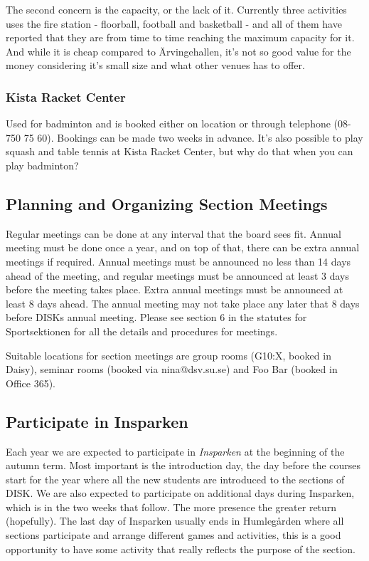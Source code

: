 \documentclass[12pt,a4paper]{article}
\begin{document}
			The second concern is the capacity, or the lack of it. Currently three activities uses the fire station - floorball, football and basketball -  and all of them have reported that they are from time to time reaching the maximum capacity for it. And while it is cheap compared to Ärvingehallen, it's not so good value for the money considering it's small size and what other venues has to offer.
			\subsubsection{Kista Racket Center}
			Used for badminton and is booked either on location or through telephone (08-750 75 60). Bookings can be made two weeks in advance. It's also possible to play squash and table tennis at Kista Racket Center, but why do that when you can play badminton?
		\subsection{Planning and Organizing Section Meetings}
		Regular meetings can be done at any interval that the board sees fit. Annual meeting must be done once a year, and on top of that, there can be extra annual meetings if required. Annual meetings must be announced no less than 14 days ahead of the meeting, and regular meetings must be announced at least 3 days before the meeting takes place. Extra annual meetings must be announced at least 8 days ahead. The annual meeting may not take place any later that 8 days before DISKs annual meeting. Please see section 6 in the statutes for Sportsektionen for all the details and procedures for meetings.

		Suitable locations for section meetings are group rooms (G10:X, booked in Daisy), seminar rooms (booked via nina@dsv.su.se) and Foo Bar (booked in Office 365).
		\subsection{Participate in Insparken}
		Each year we are expected to participate in \emph{Insparken} at the beginning of the autumn term. Most important is the introduction day, the day before the courses start for the year where all the new students are introduced to the sections of DISK. We are also expected to participate on additional days during Insparken, which is in the two weeks that follow. The more presence the greater return (hopefully). The last day of Insparken usually ends in Humlegården where all sections participate and arrange different games and activities, this is a good opportunity to have some activity that really reflects the purpose of the section.
\end{document}
